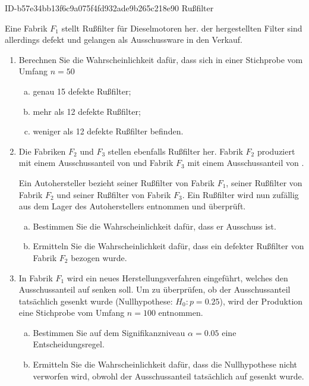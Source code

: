 \begin{exercise}
      {ID-b57e34bb13f6c9a075f4fd932ade9b265c218e90}
      {Rußfilter}
  \ifproblem\problem\par
    Eine Fabrik $F_{1}$ stellt Rußfilter für Dieselmotoren her.
     der hergestellten Filter sind allerdings defekt und
    gelangen als Ausschussware in den Verkauf.
    \begin{enumerate}[1)]
      \item Berechnen Sie die Wahrscheinlichkeit dafür, dass sich
            in einer Stichprobe vom Umfang $n=50$
            \begin{enumerate}[a)]
              \item genau 15 defekte Rußfilter;
              \item mehr als 12 defekte Rußfilter;
              \item weniger als 12 defekte Rußfilter befinden.
            \end{enumerate}
      \item Die Fabriken $F_{2}$ und $F_{3}$ stellen ebenfalls
            Rußfilter her. Fabrik $F_{2}$ produziert mit einem
            Ausschussanteil von  und Fabrik $F_{3}$ mit
            einem Ausschussanteil von .\par
            Ein Autohersteller bezieht  seiner Rußfilter
            von Fabrik $F_{1}$,  seiner Rußfilter von
            Fabrik $F_{2}$ und  seiner Rußfilter von
            Fabrik $F_{3}$. Ein Rußfilter wird nun zufällig aus
            dem Lager des Autoherstellers entnommen und überprüft.
            \begin{enumerate}[a)]
              \item Bestimmen Sie die Wahrscheinlichkeit dafür,
                    dass er Ausschuss ist.
              \item Ermitteln Sie die Wahrscheinlichkeit dafür,
                    dass ein defekter Rußfilter von Fabrik $F_{2}$
                    bezogen wurde.
            \end{enumerate}
      \item In Fabrik $F_{1}$ wird ein neues Herstellungsverfahren
            eingeführt, welches den Ausschussanteil auf 
            senken soll. Um zu überprüfen, ob der Ausschuss\-anteil
            tatsächlich gesenkt wurde (Nullhypothese: $H_{0}:p=\num{0.25}$),
            wird der Produktion eine Stichprobe vom Umfang $n=100$
            entnommen.
            \begin{enumerate}[a)]
              \item Bestimmen Sie auf dem Signifikanzniveau $\alpha=\num{0.05}$
                    eine Entscheidungsregel.
              \item Ermitteln Sie die Wahrscheinlichkeit dafür,
                    dass die Nullhypothese nicht verworfen wird,
                    obwohl der Ausschussanteil tatsächlich auf 
                    gesenkt wurde.
            \end{enumerate}
    \end{enumerate}
  \fi
\end{exercise}
